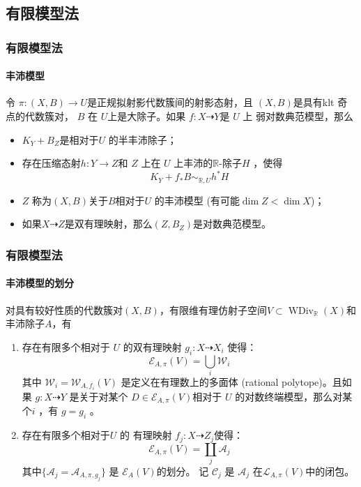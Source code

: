 \documentclass[10pt]{ctexbeamer}
\begin{document}
\subsection{有限模型法}
\begin{frame}[shrink]
  \frametitle{有限模型法}
  \framesubtitle{丰沛模型}
 令 $ \pi:(X,B)\to U $是正规拟射影代数簇间的射影态射，且 $(X, B)$是具有klt 奇点的代数簇对，  $B$ 在 $U$上是大除子。如果 $f:X\dashrightarrow Y$是 $U$ 上 弱对数典范模型，那么
  \begin{itemize}
    \item $K_{Y}+B_{Z}$是相对于$U$ 的半丰沛除子； 
    \item  存在压缩态射$h:Y\to Z$和 $Z$ 上在 $U$ 上丰沛的$\mathbb{R}$-除子$H$ ，使得 
      \[ K_{Y}+f_*B\sim_{\mathbb{R},U} h^*H \]
    \item $Z$ 称为$(X,B) $关于$B$相对于$U$ 的丰沛模型 (有可能$\dim Z < \dim X$)；
    \item 如果$X \dashrightarrow Z$是双有理映射，那么$(Z,B_{Z})$是对数典范模型。
  \end{itemize}
\end{frame}

\begin{frame}[shrink]
  \frametitle{有限模型法}
  \framesubtitle{丰沛模型的划分}
  对具有较好性质的代数簇对$(X,B)$，有限维有理仿射子空间$V \subset \operatorname{WDiv}_{\mathbb{R}}(X)$和丰沛除子$A$，有
  \begin{enumerate}
    \item   存在有限多个相对于 $U$ 的双有理映射  $g_{i}:X \dashrightarrow   X_{i}$ 使得：
          \[ \mathcal{E}_{A,\pi}(V) =\bigcup_{i}\mathcal{W}_{i} \]
          其中  $\mathcal{W}_{i}=\mathcal{W}_{A,f_{i}}(V)$ 是定义在有理数上的多面体  (rational polytope)。且如果  $g:X \dashrightarrow  Y$ 是关于对某个 $D \in \mathcal{E}_{A,\pi}(V)$相对于 $U$ 的对数终端模型，那么对某个$i$ ，有  $g=g_{i}$ 。
    \item   存在有限多个相对于$U$ 的 有理映射 $f_{j}:X \dashrightarrow  Z_{j}$使得： 
          \[ \mathcal{E}_{A,\pi}(V) =\coprod_{j}\mathcal{A}_{j} \]
          其中$ \{\mathcal{A}_j=\mathcal{A}_{A,\pi,g_j}\} $ 是 $ \mathcal{E}_{A}(V) $的划分。 记 $\mathcal{C}_{j}$ 是 $\mathcal{A}_{j}$ 在$\mathcal{L}_{A,\pi}(V)$中的闭包。
  \end{enumerate}
\end{frame}
\end{document}
